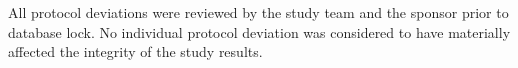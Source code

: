 \vspace{4pt}
All protocol deviations were reviewed by the study team and the sponsor prior to database lock. No individual protocol deviation was considered to have materially affected the integrity of the study results.

\newpage

